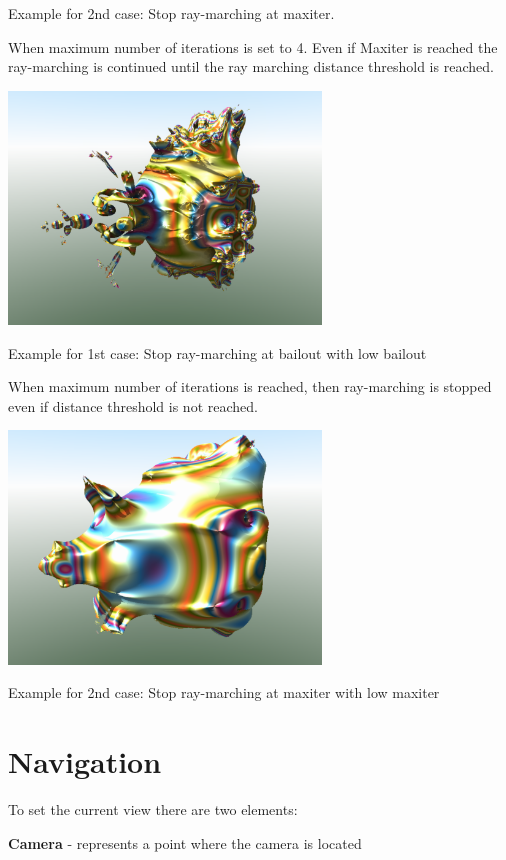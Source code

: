 Example for 2nd case: Stop ray-marching at maxiter.

When maximum number of iterations is set to 4. Even if Maxiter is
reached the ray-marching is continued until the ray marching distance
threshold is reached.

\includegraphics[width=3.26929in,height=2.44016in]{img/manual/media/image9.png}

Example for 1st case: Stop ray-marching at bailout with low bailout

When maximum number of iterations is reached, then ray-marching is
stopped even if distance threshold is not reached.

\includegraphics[width=3.26890in,height=2.44016in]{img/manual/media/image10.png}\protect\hypertarget{__RefHeading___Toc1473_2059392462}{}{}

Example for 2nd case: Stop ray-marching at maxiter with low maxiter

\section{Navigation}\label{navigation}

To set the current view there are two elements:

\textbf{Camera} - represents a point where the camera is located

